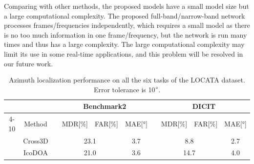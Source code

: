 \documentclass[lettersize,journal]{IEEEtran}
\begin{document}
Comparing with other methods, the proposed models have a small model size but a large computational complexity. The proposed full-band/narrow-band network processes frames/frequencies independently, which requires a small model as there is no too much information in one frame/frequency, but the network is run many times and thus has a large complexity. The large computational complexity may limit its use in some real-time applications, and this problem will be resolved in our future work.   


\begin{table}[]
\centering
\caption{Azimuth localization performance on all the six tasks of the LOCATA dataset. Error tolerance is 10$\degree$.}
\renewcommand\arraystretch{1.15}
\scriptsize
\begin{tabular}{cclccclccc} \toprule \toprule
                                                                          &                                        &  & \multicolumn{3}{c}{Benchmark2}                                                                                      &  & \multicolumn{3}{c}{DICIT}                                                                                            \\ \cmidrule{4-10} 
\multirow{-2}{*}{}                                                        & \multirow{-2}{*}{Method}               &  & MDR{[}\%{]}                          & FAR{[}\%{]}                          & MAE{[}°{]}                            &  & MDR{[}\%{]}                           & FAR{[}\%{]}                           & MAE{[}°{]}                           \\ \midrule
                                                                          & Cross3D\cite{DiazGuerra2020RobustSS}                                &  & \multicolumn{2}{c}{23.1}                                                    & 3.7                                   &  & \multicolumn{2}{c}{8.8}                                                       & 2.7                                  \\
                                                                          & IcoDOA\cite{DiazGuerra2022DirectionOA}                                 &  & \multicolumn{2}{c}{21.0}                                                    & 3.6                                   &  & \multicolumn{2}{c}{14.7}                                                      & 4.0                                  \\

\end{tabular}
\end{table}
\end{document}
